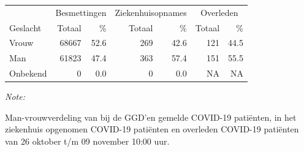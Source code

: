 \documentclass[
  english,
  man,floatsintext]{apa6}
\begin{document}
\begin{table}
\centering\begingroup\fontsize{11}{13}\selectfont

\begin{threeparttable}
\begin{tabular}{lrrrrrr}
\toprule
\multicolumn{1}{c}{ } & \multicolumn{2}{c}{Besmettingen} & \multicolumn{2}{c}{Ziekenhuisopnames} & \multicolumn{2}{c}{Overleden} \\
\cmidrule(l{3pt}r{3pt}){2-3} \cmidrule(l{3pt}r{3pt}){4-5} \cmidrule(l{3pt}r{3pt}){6-7}
Geslacht & Totaal & \% & Totaal & \% & Totaal & \%\\
\midrule
Vrouw & 68667 & 52.6 & 269 & 42.6 & 121 & 44.5\\
Man & 61823 & 47.4 & 363 & 57.4 & 151 & 55.5\\
Onbekend & 0 & 0.0 & 0 & 0.0 & NA & NA\\
\bottomrule
\end{tabular}
\begin{tablenotes}
\item \textit{Note: } 
\item Man-vrouwverdeling van bij de GGD’en gemelde COVID-19 patiënten, in het ziekenhuis opgenomen COVID-19 patiënten en overleden COVID-19 patiënten van 26 oktober t/m 09 november 10:00 uur.
\end{tablenotes}
\end{threeparttable}
\endgroup{}
\end{table}
\newpage
\end{document}

